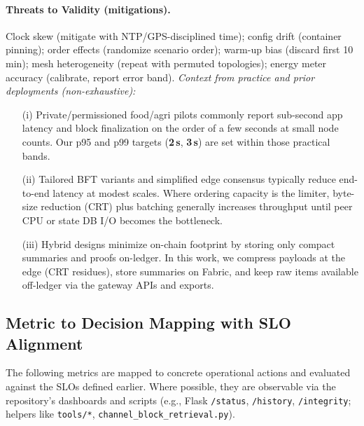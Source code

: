 \documentclass[12pt,onecolumn]{IEEEtran} %
\begin{document}
\paragraph{Threats to Validity (mitigations).}
Clock skew (mitigate with NTP/GPS-disciplined time); config drift (container pinning); order effects (randomize scenario order); warm-up bias (discard first 10\,min); mesh heterogeneity (repeat with permuted topologies); energy meter accuracy (calibrate, report error band).
\noindent\emph{Context from practice and prior deployments (non-exhaustive):}
\begin{itemize}
    \item[(i)] Private/permissioned food/agri pilots commonly report sub-second app latency and block finalization on the order of a few seconds at small node counts. Our p95 and p99 targets (\textbf{2\,s}, \textbf{3\,s}) are set within those practical bands.
    \item[(ii)] Tailored BFT variants and simplified edge consensus typically reduce end-to-end latency at modest scales. Where ordering capacity is the limiter, byte-size reduction (CRT) plus batching generally increases throughput until peer CPU or state DB I/O becomes the bottleneck.
    \item[(iii)] Hybrid designs minimize on-chain footprint by storing only compact summaries and proofs on-ledger. In this work, we compress payloads at the edge (CRT residues), store summaries on Fabric, and keep raw items available off-ledger via the gateway APIs and exports.
\end{itemize}

\subsection{Metric to Decision Mapping with SLO Alignment}
\label{sec:metric-decision}

The following metrics are mapped to concrete operational actions and evaluated against the SLOs defined earlier. Where possible, they are observable via the repository’s dashboards and scripts (e.g., Flask \texttt{/status}, \texttt{/history}, \texttt{/integrity}; helpers like \texttt{tools/*}, \texttt{channel\_block\_retrieval.py}).
\end{document}
